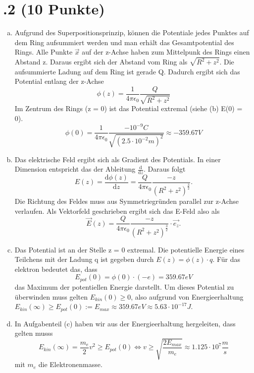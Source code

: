  \section*{\nr.2 \tittwo (10 Punkte)}
 \begin{enumerate}[(a)]
\item Aufgrund des Superpositionsprinzip, können die Potentiale jedes Punktes auf dem Ring aufsummiert werden und man erhält das Gesamtpotential des Rings. Alle Punkte $\vec{x} $ auf der z-Achse haben zum Mittelpunk des Rings einen Abstand z. Daraus ergibt sich der Abstand vom Ring als $\sqrt{R^2 + z^2}$. Die aufsummierte Ladung auf dem Ring ist gerade Q. Dadurch ergibt sich das Potential entlang der z-Achse
\begin{equation}
\phi(z) = \frac{1}{4\pi \epsilon_{0}} \frac{Q}{\sqrt{R^2 + z^2}}
\end{equation}
Im Zentrum des Rings (z = 0) ist das Potential extremal (siehe (b) E(0) = 0).
\begin{equation}
\phi(0) = \frac{1}{4\pi \epsilon_{0}} \frac{-10^{-9}C}{\sqrt{(2.5\cdot 10^{-2}m)^2}} \approx -359.67 V
\end{equation}
\item Das elektrische Feld ergibt sich als Gradient des Potentials. In einer Dimension entspricht das der Ableitung $\frac{\mathrm{d}}{\mathrm{d}z}$. Daraus folgt
\begin{equation}
E(z) = \frac{\mathrm{d}\phi (z)}{\mathrm{d}z}  = \frac{Q}{4\pi \epsilon_{0}} \frac{-z}{(R^2 + z^2)^{\frac{3}{2}}}.
\end{equation}
Die Richtung des Feldes muss aus Symmetriegründen parallel zur z-Achse verlaufen. Als Vektorfeld geschrieben ergibt sich das E-Feld also als
\begin{equation}
\vec{E}(z) = \frac{Q}{4\pi \epsilon_{0}} \frac{-z}{(R^2 + z^2)^{\frac{3}{2}}} \cdot \vec{e_{z}}.
\end{equation}
\item Das Potential ist an der Stelle z = 0 extremal. Die potentielle Energie eines Teilchens mit der Ladung q ist gegeben durch $E(z) = \phi(z) \cdot q$. Für das elektron bedeutet das, dass
\begin{equation}
E_{pot}(0) = \phi(0) \cdot (-e) = 359.67 eV
\end{equation}
das Maximum der potentiellen Energie darstellt. Um dieses Potential zu überwinden muss gelten $E_{kin}(0) \ge 0$, also aufgrund von Energieerhaltung $E_{kin}(\infty) \ge E_{pot}(0) := E_{max} \approx 359.67 eV \approx 5.63 \cdot 10^{-17} J$.
\item In Aufgabenteil (c) haben wir aus der Energieerhaltung hergeleiten, dass gelten musss
\begin{equation}
E_{kin}(\infty) = \frac{m_{e}}{2} v^2 \ge E_{pot}(0) \Leftrightarrow v \ge \sqrt{\frac{2E_{max}}{m_{e}}} \approx 1.125 \cdot 10^{7} \frac{m}{s}
\end{equation}
mit $m_{e}$ die Elektronenmasse.
\end{enumerate}